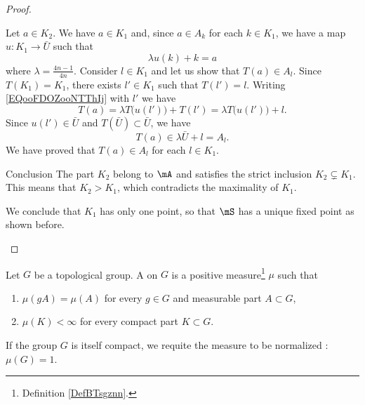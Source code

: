 \begin{proof}
\begin{subproof}
\begin{subproof}
        Let \( a\in K_2\). We have \( a\in K_1\) and, since \( a\in A_k\) for each \( k\in K_1\), we have a map \( u\colon K_1\to \bar U\) such that
        \begin{equation}        \label{EQooFDOZooNTThIj}
            \lambda u(k)+k=a
        \end{equation}
        where \( \lambda=\frac{ 4n-1 }{ 4n }\). 
        Consider \( l\in K_1\) and let us show that \( T(a)\in A_{l}\). Since \( T(K_1)=K_1\), there exists \( l'\in K_1\) such that \( T(l')=l\). Writing \eqref{EQooFDOZooNTThIj} with \( l'\) we have
        \begin{equation}
            T(a)=\lambda T\big( u(l') \big)+T(l')=\lambda T\big( u(l') \big)+l.
        \end{equation}
        Since \( u(l')\in \bar U\) and \( T(\bar U)\subset \bar U\), we have
        \begin{equation}
            T(a)\in \lambda\bar U+l=A_l.
        \end{equation}
        We have proved that \( T(a)\in A_l\) for each \( l\in K_1\).
        \end{subproof}
    \item[Conclusion]
        The part \( K_2\) belong to \( \mA\) and satisfies the strict inclusion \( K_2\subsetneq K_1\). This means that \( K_2>K_1\), which contradicts the maximality of \( K_1\).

        We conclude that \( K_1\) has only one point, so that \( \mS\) has a unique fixed point as shown before.
    \end{subproof}
\end{proof}


\begin{definition}      \label{DEFooXIKEooWOxHlr}
    Let \( G\) be a topological group. A  on \( G\) is a positive measure\footnote{Definition \ref{DefBTsgznn}.} \( \mu\) such that
	\begin{enumerate}
		\item
		      \( \mu(gA)=\mu(A)\) for every \( g\in G\) and measurable part \( A\subset G\),
		\item
		      \( \mu(K)<\infty\) for every compact part \( K\subset G\).
	\end{enumerate}
    If the group \( G\) is itself compact, we requite the measure to be normalized : \( \mu(G)=1\).
\end{definition}

